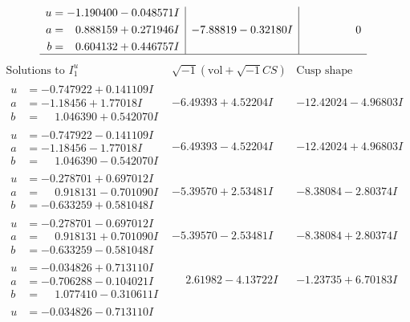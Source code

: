 \documentclass[1p]{elsarticle_modified}
\theoremstyle{definition}
\newcommand{\I}{\sqrt{-1}}
\begin{document}
$$\begin{array}{c|c|c}
\begin{aligned}
u &= -1.190400 - 0.048571 I \\
a &= \phantom{-}0.888159 + 0.271946 I \\
b &= \phantom{-}0.604132 + 0.446757 I\end{aligned}
 & -7.88819 - 0.32180 I & \phantom{-0.000000 } 0\\
 \hline 
 \end{array}$$\newpage$$\begin{array}{c|c|c}  
\text{Solutions to }I^u_{1}& \I (\text{vol} + \sqrt{-1}CS) & \text{Cusp shape}\\
 \hline 
\begin{aligned}
u &= -0.747922 + 0.141109 I \\
a &= -1.18456 + 1.77018 I \\
b &= \phantom{-}1.046390 + 0.542070 I\end{aligned}
 & -6.49393 + 4.52204 I & -12.42024 - 4.96803 I \\ \hline\begin{aligned}
u &= -0.747922 - 0.141109 I \\
a &= -1.18456 - 1.77018 I \\
b &= \phantom{-}1.046390 - 0.542070 I\end{aligned}
 & -6.49393 - 4.52204 I & -12.42024 + 4.96803 I \\ \hline\begin{aligned}
u &= -0.278701 + 0.697012 I \\
a &= \phantom{-}0.918131 - 0.701090 I \\
b &= -0.633259 + 0.581048 I\end{aligned}
 & -5.39570 + 2.53481 I & -8.38084 - 2.80374 I \\ \hline\begin{aligned}
u &= -0.278701 - 0.697012 I \\
a &= \phantom{-}0.918131 + 0.701090 I \\
b &= -0.633259 - 0.581048 I\end{aligned}
 & -5.39570 - 2.53481 I & -8.38084 + 2.80374 I \\ \hline\begin{aligned}
u &= -0.034826 + 0.713110 I \\
a &= -0.706288 - 0.104021 I \\
b &= \phantom{-}1.077410 - 0.310611 I\end{aligned}
 & \phantom{-}2.61982 - 4.13722 I & -1.23735 + 6.70183 I \\ \hline\begin{aligned}
u &= -0.034826 - 0.713110 I \\

\end{aligned}
\end{array}$$
\end{document}
